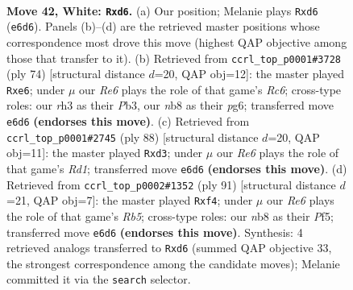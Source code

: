 \documentclass[11pt]{article}
\begin{document}
\clearpage

\begin{figure}[p]\centering
\begin{subfigure}{0.46\textwidth}\centering
\resizebox{\linewidth}{!}{%
\newchessgame
\chessboard[
  setfen={1n3k2/8/1p1pR3/1P1P4/p1p3P1/7r/1P6/2K5 w - - 0 42},
  showmover=false,
  pgfstyle=straightmove, color=movearrow, markmove={e6-d6}
]}
\caption{}
\end{subfigure}\hfill
\begin{subfigure}{0.46\textwidth}\centering
\resizebox{\linewidth}{!}{%
\newchessgame
\chessboard[
  setfen={3r4/7k/2R1p1p1/p6p/4P3/1P5P/6P1/7K w - - 0 38},
  showmover=false,
  pgfstyle=straightmove, color=movearrow, markmove={c6-e6}
]}
\caption{}
\end{subfigure}
\\[4pt]
\begin{subfigure}{0.46\textwidth}\centering
\resizebox{\linewidth}{!}{%
\newchessgame
\chessboard[
  setfen={7k/8/6pp/1r6/3pP1P1/3p3P/8/3R2K1 w - - 0 45},
  showmover=false,
  pgfstyle=straightmove, color=movearrow, markmove={d1-d3}
]}
\caption{}
\end{subfigure}\hfill
\begin{subfigure}{0.46\textwidth}\centering
\resizebox{\linewidth}{!}{%
\newchessgame
\chessboard[
  setfen={8/5kp1/3p4/3K1p2/1r3P1P/3P3P/8/4R3 b - - 0 46},
  showmover=false,
  pgfstyle=straightmove, color=movearrow, markmove={b4-f4}
]}
\caption{}
\end{subfigure}
\caption{\textbf{Move 42, White: \texttt{Rxd6}.} (a) Our position; Melanie plays \texttt{Rxd6} (\texttt{e6d6}). Panels (b)--(d) are the retrieved master positions whose correspondence most drove this move (highest QAP objective among those that transfer to it). (b) Retrieved from \texttt{ccrl\_top\_p0001\#3728} (ply 74) [structural distance $d$=20, QAP obj=12]: the master played \texttt{Rxe6}; under $\mu$ our \emph{Re6} plays the role of that game's \emph{Rc6}; cross-type roles: our \emph{r}h3 as their \emph{P}b3, our \emph{n}b8 as their \emph{p}g6; transferred move \texttt{e6d6} \textbf{(endorses this move)}. (c) Retrieved from \texttt{ccrl\_top\_p0001\#2745} (ply 88) [structural distance $d$=20, QAP obj=11]: the master played \texttt{Rxd3}; under $\mu$ our \emph{Re6} plays the role of that game's \emph{Rd1}; transferred move \texttt{e6d6} \textbf{(endorses this move)}. (d) Retrieved from \texttt{ccrl\_top\_p0002\#1352} (ply 91) [structural distance $d$=21, QAP obj=7]: the master played \texttt{Rxf4}; under $\mu$ our \emph{Re6} plays the role of that game's \emph{Rb5}; cross-type roles: our \emph{n}b8 as their \emph{P}f5; transferred move \texttt{e6d6} \textbf{(endorses this move)}. Synthesis: 4 retrieved analogs transferred to \texttt{Rxd6} (summed QAP objective 33, the strongest correspondence among the candidate moves); Melanie committed it via the \texttt{search} selector.}
\label{fig:thought-m82}
\end{figure}
\end{document}
